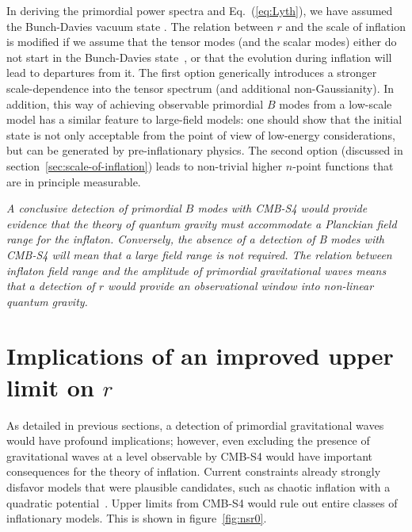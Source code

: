 In deriving the primordial power spectra and Eq.~(\ref{eq:Lyth}), we have assumed the Bunch-Davies vacuum state \cite{BunchDavies}. The relation between $r$ and the scale of inflation is modified if we assume that the tensor  modes (and the scalar modes) either do not start in the Bunch-Davies state~\cite{Ashoorioon:2014nta,Collins:2014yua}, or that the evolution during inflation will lead to departures from it. The first option generically introduces a stronger scale-dependence into the tensor spectrum \cite{Aravind:2014axa,Flauger:2013hra} (and additional non-Gaussianity). In addition, this way of achieving observable primordial $B$ modes from a low-scale model has a similar feature to large-field models: one should show that the initial state is not only acceptable from the point of view of low-energy considerations, but can be generated by pre-inflationary physics. The second option (discussed in section~\ref{sec:scale-of-inflation}) leads to non-trivial higher $n$-point functions that are in principle measurable.

{\it A conclusive detection of primordial $B$ modes with CMB-S4 would provide evidence that the theory of quantum gravity must accommodate a Planckian field range for the inflaton. Conversely, the absence of a detection of B modes with CMB-S4 will mean that a large field range is not required. The relation between inflaton field range and the amplitude of primordial gravitational waves means that a detection of $r$ would provide an observational window into non-linear quantum gravity.}


\section{Implications of an improved upper limit on $r$} 
\label{sec:upperLimits}
As detailed in previous sections, a detection of primordial gravitational waves would have profound implications; however, even excluding the presence of gravitational waves at a level observable by CMB-S4 would have important consequences for the theory of inflation. Current constraints already strongly disfavor models that were plausible candidates, such as chaotic inflation with a quadratic potential~\cite{Ade:2015lrj,Ade:2015tva,Array:2015xqh}. Upper limits from CMB-S4 would rule out entire classes of inflationary models. This is shown in figure~\ref{fig:nsr0}. 

